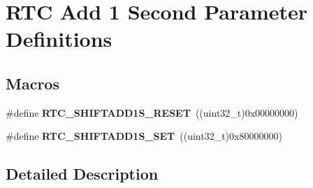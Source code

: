 \hypertarget{group___r_t_c_ex___add__1___second___parameter___definitions}{}\section{R\+TC Add 1 Second Parameter Definitions}
\label{group___r_t_c_ex___add__1___second___parameter___definitions}
\subsection*{Macros}
\begin{DoxyCompactItemize}
\item 
\#define {\bfseries R\+T\+C\+\_\+\+S\+H\+I\+F\+T\+A\+D\+D1\+S\+\_\+\+R\+E\+S\+ET}~((uint32\+\_\+t)0x00000000)\hypertarget{group___r_t_c_ex___add__1___second___parameter___definitions_gaadc96f8fbcb4a576dc126c8a78476864}{}\label{group___r_t_c_ex___add__1___second___parameter___definitions_gaadc96f8fbcb4a576dc126c8a78476864}

\item 
\#define {\bfseries R\+T\+C\+\_\+\+S\+H\+I\+F\+T\+A\+D\+D1\+S\+\_\+\+S\+ET}~((uint32\+\_\+t)0x80000000)\hypertarget{group___r_t_c_ex___add__1___second___parameter___definitions_gac22d753caa7eae6b1f4564eba3727900}{}\label{group___r_t_c_ex___add__1___second___parameter___definitions_gac22d753caa7eae6b1f4564eba3727900}

\end{DoxyCompactItemize}


\subsection{Detailed Description}
